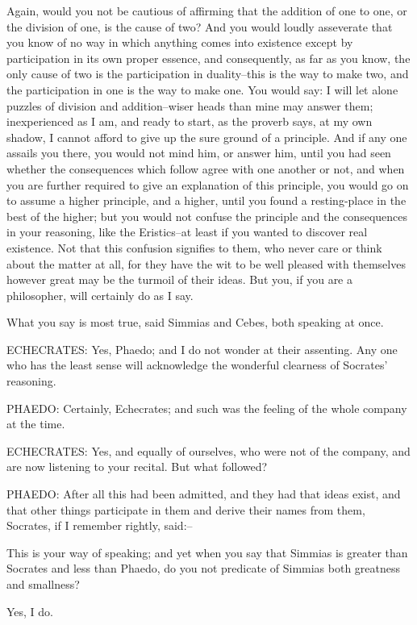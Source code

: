 Again, would you not be cautious of affirming that the addition of
one to one, or the division of one, is the cause of two? And you would
loudly asseverate that you know of no way in which anything comes
into existence except by participation in its own proper essence,
and consequently, as far as you know, the only cause of two is
the participation in duality--this is the way to make two, and the
participation in one is the way to make one. You would say: I will let
alone puzzles of division and addition--wiser heads than mine may answer
them; inexperienced as I am, and ready to start, as the proverb says,
at my own shadow, I cannot afford to give up the sure ground of a
principle. And if any one assails you there, you would not mind him,
or answer him, until you had seen whether the consequences which follow
agree with one another or not, and when you are further required to give
an explanation of this principle, you would go on to assume a higher
principle, and a higher, until you found a resting-place in the best of
the higher; but you would not confuse the principle and the consequences
in your reasoning, like the Eristics--at least if you wanted to discover
real existence. Not that this confusion signifies to them, who never
care or think about the matter at all, for they have the wit to be well
pleased with themselves however great may be the turmoil of their ideas.
But you, if you are a philosopher, will certainly do as I say.

What you say is most true, said Simmias and Cebes, both speaking at
once.

ECHECRATES: Yes, Phaedo; and I do not wonder at their assenting. Any
one who has the least sense will acknowledge the wonderful clearness of
Socrates' reasoning.

PHAEDO: Certainly, Echecrates; and such was the feeling of the whole
company at the time.

ECHECRATES: Yes, and equally of ourselves, who were not of the company,
and are now listening to your recital. But what followed?

PHAEDO: After all this had been admitted, and they had that ideas exist,
and that other things participate in them and derive their names from
them, Socrates, if I remember rightly, said:--

This is your way of speaking; and yet when you say that Simmias is
greater than Socrates and less than Phaedo, do you not predicate of
Simmias both greatness and smallness?

Yes, I do.

